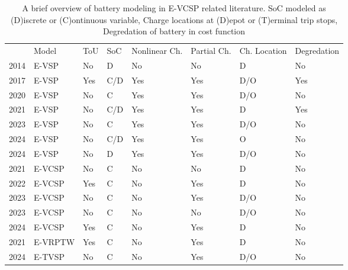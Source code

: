 \documentclass[]{article}
\begin{document}
\begin{table}[h]
  \centering
  \begin{tabular}{clllllll}
    \toprule
                                     & Model   & ToU & SoC & Nonlinear Ch. & Partial Ch. & Ch. Location & Degredation \\
    \cmidrule(lr){2-8}
    \cite{Li2014} 2014               & E-VSP   & No  & D   & No            & No          & D            & No          \\
    \cite{vanKootenNiekerk2017} 2017 & E-VSP   & Yes & C/D & Yes           & Yes         & D/O          & Yes         \\
    \cite{Olsen2020} 2020            & E-VSP   & No  & C   & Yes           & Yes         & D/O          & No          \\
    \cite{Zhang2021} 2021            & E-VSP   & No  & C/D & Yes           & Yes         & D            & Yes         \\
    \cite{Parmentier2023} 2023       & E-VSP   & No  & C   & Yes           & Yes         & D/O          & No          \\
    \cite{Pulyassary2024} 2024       & E-VSP   & No  & C/D & Yes           & Yes         & O            & No          \\
    \cite{deVos2024} 2024            & E-VSP   & No  & D   & Yes           & Yes         & D/O          & No          \\
    \addlinespace[0.4em]
    \cite{Perumal2021} 2021          & E-VCSP  & No  & C   & No            & No          & D            & No          \\
    \cite{Wang2022} 2022             & E-VCSP  & Yes & C   & No            & Yes         & D            & No          \\
    \cite{Sistig2023} 2023           & E-VCSP  & No  & C   & No            & Yes         & D/O          & No          \\
    \cite{Shen2023} 2023             & E-VCSP  & No  & C   & No            & No          & D/O          & No          \\
    \cite{Cong2024} 2024             & E-VCSP  & Yes & C   & No            & Yes         & D            & No          \\
    \addlinespace[0.4em]
    \cite{Ham2021} 2021              & E-VRPTW & Yes & C   & No            & Yes         & D            & No          \\
    \cite{Stadnichuk2024} 2024       & E-TVSP  & No  & C   & No            & Yes         & D/O          & No          \\
    \bottomrule
  \end{tabular}
  \caption{A brief overview of battery modeling in E-VCSP related literature. SoC modeled as (D)iscrete or (C)ontinuous variable, Charge locations at (D)epot or (T)erminal trip stops, Degredation of battery in cost function}
  \label{tab:eVCSP-lit}
\end{table}
\end{document}
